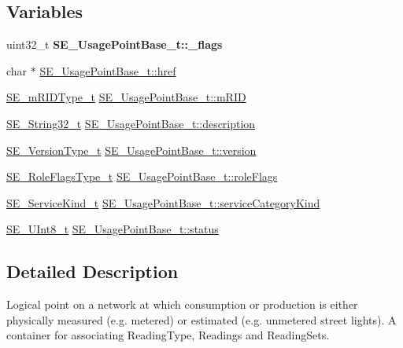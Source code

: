 \subsection*{Variables}
\begin{DoxyCompactItemize}
\item 
\mbox{\label{group__UsagePointBase_gaa739ff9121db9428fdcef35e64cedc34}} 
uint32\+\_\+t {\bfseries S\+E\+\_\+\+Usage\+Point\+Base\+\_\+t\+::\+\_\+flags}
\item 
char $\ast$ \hyperlink{group__UsagePointBase_ga6c126f5b6370940f33b5ee3b1c8e276b}{S\+E\+\_\+\+Usage\+Point\+Base\+\_\+t\+::href}
\item 
\hyperlink{group__mRIDType_gac74622112f3a388a2851b2289963ba5e}{S\+E\+\_\+m\+R\+I\+D\+Type\+\_\+t} \hyperlink{group__UsagePointBase_gaba28fa565fb1533854f42c17887fc69a}{S\+E\+\_\+\+Usage\+Point\+Base\+\_\+t\+::m\+R\+ID}
\item 
\hyperlink{group__String32_gac9f59b06b168b4d2e0d45ed41699af42}{S\+E\+\_\+\+String32\+\_\+t} \hyperlink{group__UsagePointBase_gabfbb1effbbe5fd8f045208410f1d73a4}{S\+E\+\_\+\+Usage\+Point\+Base\+\_\+t\+::description}
\item 
\hyperlink{group__VersionType_ga4b8d27838226948397ed99f67d46e2ae}{S\+E\+\_\+\+Version\+Type\+\_\+t} \hyperlink{group__UsagePointBase_gadfbfb6da5311e41818e8d9df8109c4b6}{S\+E\+\_\+\+Usage\+Point\+Base\+\_\+t\+::version}
\item 
\hyperlink{group__RoleFlagsType_gac20b70bba5dd7d6773b13d69c372c957}{S\+E\+\_\+\+Role\+Flags\+Type\+\_\+t} \hyperlink{group__UsagePointBase_ga3e4b9238ad11c245c622b2a7bb5bbf6c}{S\+E\+\_\+\+Usage\+Point\+Base\+\_\+t\+::role\+Flags}
\item 
\hyperlink{group__ServiceKind_ga19a788255c7eeda579474fc6f3cc0810}{S\+E\+\_\+\+Service\+Kind\+\_\+t} \hyperlink{group__UsagePointBase_ga17715cd7dae4aee1bf4b42dd3e43ebf9}{S\+E\+\_\+\+Usage\+Point\+Base\+\_\+t\+::service\+Category\+Kind}
\item 
\hyperlink{group__UInt8_gaf7c365a1acfe204e3a67c16ed44572f5}{S\+E\+\_\+\+U\+Int8\+\_\+t} \hyperlink{group__UsagePointBase_gac5ad1f28ffeedfbbe4348b73d1ad02aa}{S\+E\+\_\+\+Usage\+Point\+Base\+\_\+t\+::status}
\end{DoxyCompactItemize}


\subsection{Detailed Description}
Logical point on a network at which consumption or production is either physically measured (e.\+g. metered) or estimated (e.\+g. unmetered street lights). A container for associating Reading\+Type, Readings and Reading\+Sets. 

